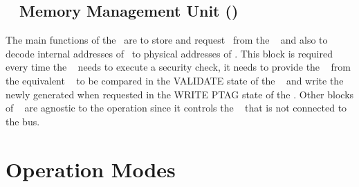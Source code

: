 



\subsection{\ptag~ Memory Management Unit (\pmmu)}
\label{subsec:pmmu}
The main functions of the \pmmu~are to store and request \ptags~from the \ptagmem~ and also to decode internal addresses of \ptags~to physical addresses of \ptagmem. This block is required every time the \handler~ needs to execute a security check, it needs to provide the \ptag ~ from the equivalent \slines~  to be compared in the VALIDATE state of the \seceng~  and write the newly generated \ptags when requested in the WRITE PTAG state of the \seceng.  Other blocks of \cshia~ are agnostic to the \pmmu operation since it controls the \ptagmem~ that is not connected to the bus.


\section{Operation Modes}
\label{sec:opmodes}



